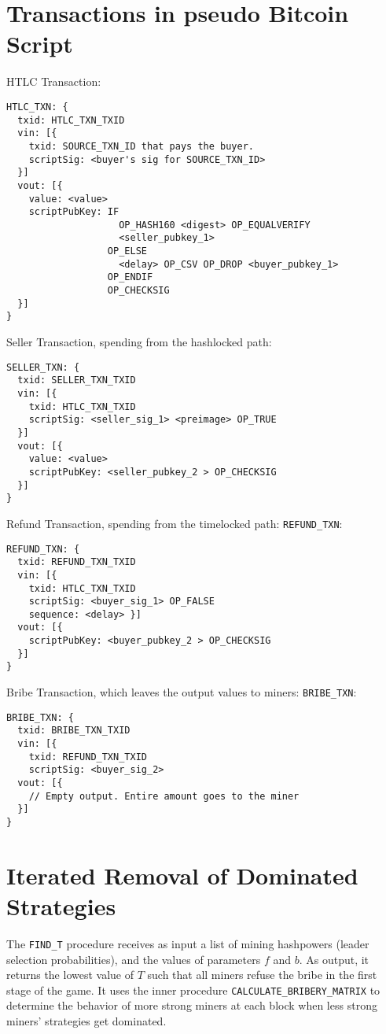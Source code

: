 \documentclass[runningheads]{llncs}
\newcommand{\bribetxn}{\texttt{BRIBE\_TXN}}
\newcommand{\refundtxn}{\texttt{REFUND\_TXN}}
\begin{document}
\begin{subappendices}
\renewcommand{\thesection}{\Alph{section}}%
\section{Transactions in pseudo Bitcoin Script}
\label{appendex:transactions}
HTLC Transaction:
\begin{lstlisting}
HTLC_TXN: { 
  txid: HTLC_TXN_TXID
  vin: [{ 
    txid: SOURCE_TXN_ID that pays the buyer.
    scriptSig: <buyer's sig for SOURCE_TXN_ID> 
  }]      
  vout: [{ 
    value: <value>
    scriptPubKey: IF
                    OP_HASH160 <digest> OP_EQUALVERIFY 
                    <seller_pubkey_1>
                  OP_ELSE
                    <delay> OP_CSV OP_DROP <buyer_pubkey_1>
                  OP_ENDIF
                  OP_CHECKSIG 
  }]
}
\end{lstlisting}
Seller Transaction, spending from the hashlocked path:
\begin{lstlisting}
SELLER_TXN: { 
  txid: SELLER_TXN_TXID
  vin: [{ 
    txid: HTLC_TXN_TXID
    scriptSig: <seller_sig_1> <preimage> OP_TRUE 
  }]      
  vout: [{ 
    value: <value>
    scriptPubKey: <seller_pubkey_2 > OP_CHECKSIG 
  }]
}
\end{lstlisting}
Refund Transaction, spending from the timelocked path:
\refundtxn{}:
\begin{lstlisting}
REFUND_TXN: { 
  txid: REFUND_TXN_TXID
  vin: [{ 
    txid: HTLC_TXN_TXID
    scriptSig: <buyer_sig_1> OP_FALSE
    sequence: <delay> }]      
  vout: [{ 
    scriptPubKey: <buyer_pubkey_2 > OP_CHECKSIG
  }]
}
\end{lstlisting}
Bribe Transaction, which leaves the output values to miners:
\bribetxn{}:
\begin{lstlisting}
BRIBE_TXN: { 
  txid: BRIBE_TXN_TXID
  vin: [{ 
    txid: REFUND_TXN_TXID
    scriptSig: <buyer_sig_2>
  vout: [{ 
    // Empty output. Entire amount goes to the miner 
  }]
}
\end{lstlisting}


\section{Iterated Removal of Dominated Strategies}
The \texttt{FIND\_T} procedure receives as input a list of mining hashpowers (leader selection probabilities), and the values of parameters $f$ and $b$. As output, it returns the lowest value of $T$ such that all miners refuse the bribe in the first stage of the game. It uses the inner procedure \texttt{CALCULATE\_BRIBERY\_MATRIX} to determine the behavior of more strong miners at each block when less strong miners' strategies get dominated.


\end{subappendices}
\end{document}
